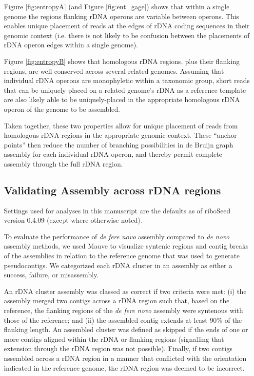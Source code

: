 \documentclass[10pt]{article}
\begin{document}
\begin{linenumbers}
Figure \ref{fig:entropyA} (and Figure \ref{fig:ent_gage}) shows that within a single genome the regions flanking rDNA operons are variable between operons. This enables unique placement of reads at the edges of rDNA coding sequences in their genomic context (i.e. there is not likely to be confusion between the placements of rDNA operon edges within a single genome).


Figure \ref{fig:entropyB} shows that homologous rDNA regions, plus their flanking regions, are well-conserved across several related genomes. Assuming that individual rDNA operons are monophyletic within a taxonomic group, short reads that can be uniquely placed on a related genome's rDNA as a reference template are also likely able to be uniquely-placed in the appropriate homologous rDNA operon of the genome to be assembled.


Taken together, these two properties allow for unique placement of reads from homologous rDNA regions in the appropriate genomic context. These ``anchor points'' then reduce the number of branching possibilities in de Bruijn graph assembly for each individual rDNA operon, and thereby permit complete assembly through the full rDNA region.


\subsection*{Validating Assembly across rDNA regions}

Settings used for analyses in this manuscript are the defaults as of riboSeed version 0.4.09 (except where otherwise noted).


To evaluate the performance of \textit{de fere novo} assembly compared to \textit{de novo} assembly methods, we used Mauve to visualize syntenic regions and contig breaks of the assemblies in relation to the reference genome that was used to generate pseudocontigs. We categorized each rDNA cluster in an assembly as either a success, failure, or misassembly.

An rDNA cluster assembly was classed as correct if two criteria were met: (i) the assembly merged two contigs across a rDNA region such that, based on the reference, the flanking regions of the \textit{de fere novo} assembly were syntenous with those of the reference; and (ii) the assembled contig extends at least 90\% of the flanking length. An assembled cluster was defined as skipped if the ends of one or more contigs aligned within the rDNA or flanking regions (signalling that extension through the rDNA region was not possible). Finally, if two contigs assembled across a rDNA region in a manner that conflicted with the orientation indicated in the reference genome, the rDNA region was deemed to be incorrect.


\end{linenumbers}
\end{document}

